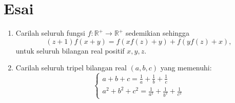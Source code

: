 \documentclass[12pt]{scrartcl}
\begin{document}
	\section{Esai}
	\begin{enumerate}
		\item Carilah seluruh fungsi $f: \mathbb{R}^+ \to \mathbb{R}^+$ sedemikian sehingga
		$$(z + 1)f(x + y) = f(xf(z) + y) + f(yf(z) + x),$$untuk seluruh bilangan real positif $x, y, z$.
		
		\item Carilah seluruh tripel bilangan real $(a,b,c)$ yang memenuhi:
		$$\begin{cases} a+b+c=\frac{1}{a}+\frac{1}{b}+\frac{1}{c} \\a^2+b^2+c^2=\frac{1}{a^2}+\frac{1}{b^2}+\frac{1}{c^2}\end{cases}$$
	\end{enumerate}
\end{document}
